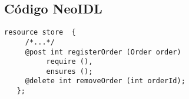 \subsection{Código NeoIDL}

\begin{lstlisting}[language=NeoIDL, style=NeoIDLstyle, caption=Basedo em Spec\#] 
   resource store  {
     /*...*/
     @post int registerOrder (Order order)
          require (),
          ensures ();
     @delete int removeOrder (int orderId);
   };
\end{lstlisting}

\clearpage

